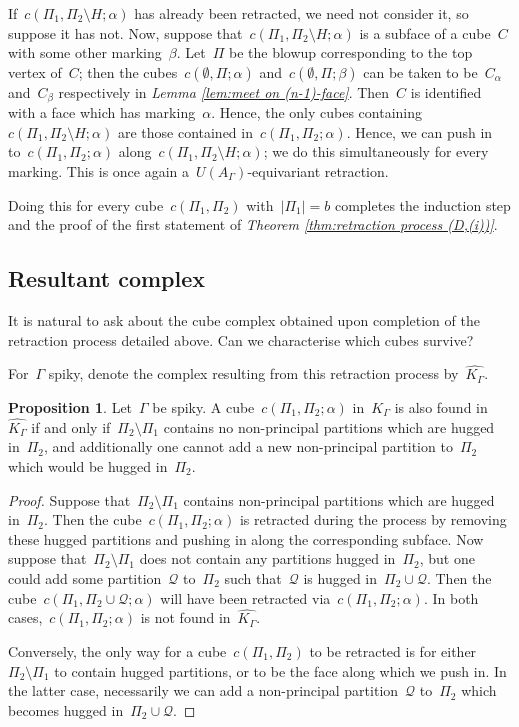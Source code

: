 \documentclass[11pt]{amsart}
\theoremstyle{definition}
\theoremstyle{definition}
\theoremstyle{definition}
\theoremstyle{definition}
\newtheorem{proposition}[theorem]{Proposition}
\newcommand{\calQ}{\mathcal{Q}}
\newcommand{\uag}{U(A_{\Gamma})} %
\newcommand{\spine}{K_{\Gamma}} %
\newcommand{\res}{\widehat{K_\Gamma}} %
\begin{document}
If~$c(\Pi_1, \Pi_2 \setminus H; \alpha)$ has already been retracted, we need not consider it, so suppose it has not. Now, suppose that~$c(\Pi_1, \Pi_2 \setminus H; \alpha)$ is a subface of a cube~$C$ with some other marking~$\beta$. Let~$\Pi$ be the blowup corresponding to the top vertex of~$C$; then the cubes~$c(\emptyset, \Pi; \alpha)$ and~$c(\emptyset, \Pi; \beta)$ can be taken to be~$C_\alpha$ and~$C_\beta$ respectively in \textit{Lemma \ref{lem:meet on (n-1)-face}}. Then~$C$ is identified with a face which has marking~$\alpha$. Hence, the only cubes containing~$c(\Pi_1, \Pi_2 \setminus H; \alpha)$ are those contained in~$c(\Pi_1, \Pi_2; \alpha)$. Hence, we can push in to~$c(\Pi_1, \Pi_2; \alpha)$ along~$c(\Pi_1, \Pi_2 \setminus H; \alpha)$; we do this simultaneously for every marking. This is once again a~$\uag$-equivariant retraction. 

Doing this for every cube~$c(\Pi_1, \Pi_2)$ with~$\vert \Pi_1 \vert = b$ completes the induction step and the proof of the first statement of \emph{Theorem \ref{thm:retraction process (D,(i))}}.

\subsection{Resultant complex}\label{subsec:resultant complex}

It is natural to ask about the cube complex obtained upon completion of the retraction process detailed above. Can we characterise which cubes survive?

For~$\Gamma$ spiky, denote the complex resulting from this retraction process by~$\res$.

\begin{proposition}\label{prop:characterisation of resultant complex}
    Let~$\Gamma$ be spiky. A cube~$c(\Pi_1, \Pi_2; \alpha)$ in~$\spine$ is also found in~$\res$ if and only if~$\Pi_2 \setminus \Pi_1$ contains no non-principal partitions which are hugged in~$\Pi_2$, and additionally one cannot add a new non-principal partition to~$\Pi_2$ which would be hugged in~$\Pi_2$. 
\end{proposition}

\begin{proof}
    Suppose that~$\Pi_2 \setminus \Pi_1$ contains non-principal partitions which are hugged in~$\Pi_2$. Then the cube~$c(\Pi_1, \Pi_2; \alpha)$ is retracted during the process by removing these hugged partitions and pushing in along the corresponding subface. Now suppose that~$\Pi_2 \setminus \Pi_1$ does not contain any partitions hugged in~$\Pi_2$, but one could add some partition~$\calQ$ to~$\Pi_2$ such that~$\calQ$ is hugged in~$\Pi_2 \cup \calQ$. Then the cube~$c(\Pi_1, \Pi_2 \cup \calQ; \alpha)$ will have been retracted via~$c(\Pi_1, \Pi_2; \alpha)$. In both cases,~$c(\Pi_1, \Pi_2; \alpha)$ is not found in~$\res$.

    Conversely, the only way for a cube~$c(\Pi_1, \Pi_2)$ to be retracted is for either~$\Pi_2 \setminus \Pi_1$ to contain hugged partitions, or to be the face along which we push in. In the latter case, necessarily we can add a non-principal partition~$\calQ$ to~$\Pi_2$ which becomes hugged in~$\Pi_2 \cup \calQ$.
\end{proof}
\end{document}
